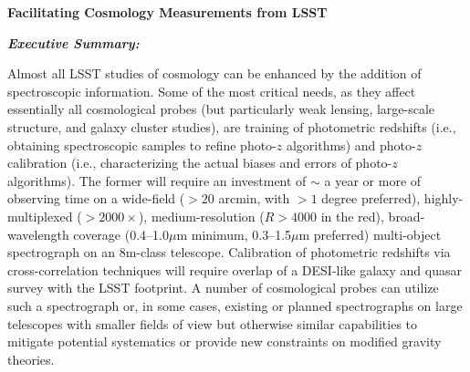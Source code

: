 \documentclass[12pt]{report}
\begin{document}
\pagestyle{fancy}
\fancyfoot{}%
\fancyfoot[R]{\thepage}  %

\fancyhead[R]{}
\renewcommand{\footrulewidth}{1pt}


\begin{centering}
{\huge{\bf{{Facilitating Cosmology Measurements from LSST}}}}


{\it{\bf Executive Summary:}}
\end{centering}
%

Almost all LSST studies of cosmology can be enhanced by the addition of spectroscopic information.  Some of the most critical needs, as they affect essentially all cosmological probes (but particularly weak lensing, large-scale structure, and galaxy cluster studies), are training of photometric redshifts (i.e., obtaining spectroscopic samples to refine photo-$z$ algorithms) and photo-$z$ calibration (i.e., characterizing the actual biases and errors of photo-$z$ algorithms).  The former will require an investment of $\sim$ a year or more of observing time on a wide-field ($>20$ arcmin, with $>1$ degree preferred), highly-multiplexed ($>2000\times$), medium-resolution ($R>4000$ in the red), broad-wavelength coverage (0.4--1.0$\mu$m minimum, 0.3--1.5$\mu$m preferred) multi-object spectrograph on an 8m-class telescope.  Calibration of photometric redshifts via cross-correlation techniques will require overlap of a DESI-like galaxy and quasar survey with the LSST footprint.  A number of cosmological probes can utilize such a spectrograph or, in some cases, existing or planned spectrographs on large telescopes with smaller fields of view but otherwise similar capabilities to mitigate potential systematics or provide new constraints on modified gravity theories.
\end{document}

